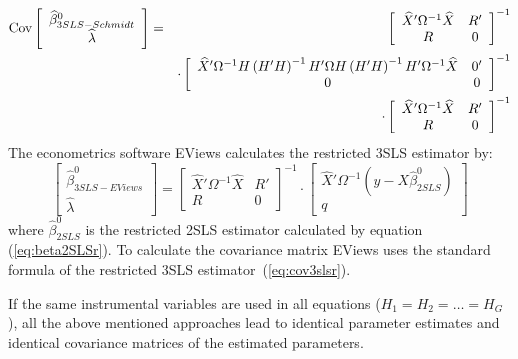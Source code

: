 \begin{eqnarray}
   \text{Cov} 
   \left[ \begin{array}{c}
      \widehat{\beta}^0_{3SLS-Schmidt} \\ \widehat{\lambda}
   \end{array} \right] 
   & = & 
   \left[ \begin{array}{cc}
      \widehat{X}' \Omega^{-1} \widehat{X} & R' \\ 
      R & 0
   \end{array} \right]^{-1}
   \\
   & & \cdot
   \left[ \begin{array}{cc}
      \widehat{X}' \Omega^{-1} H \left( H' H \right)^{-1} H' \Omega
      H \left( H' H \right)^{-1} H' \Omega^{-1} \widehat{X} & 0' \\ 
      0 & 0
   \end{array} \right]^{-1}
   \nonumber \\
   & & \cdot
   \left[ \begin{array}{cc}
      \widehat{X}' \Omega^{-1} \widehat{X} & R' \\ 
      R & 0
   \end{array} \right]^{-1}
   \nonumber
\end{eqnarray}
The econometrics software EViews calculates the restricted 3SLS estimator by:
\begin{equation}
   \left[ \begin{array}{c}
      \widehat{\beta}^0_{3SLS-EViews} \\ \widehat{\lambda}
   \end{array} \right]
   =
   \left[ \begin{array}{cc}
      \widehat{X}' \Omega^{-1} \widehat{X} & R' \\ 
      R & 0
   \end{array} \right]^{-1}
   \cdot
   \left[ \begin{array}{c}
      \widehat{X}' \Omega^{-1} \left( y - X \widehat{\beta}^0_{2SLS} \right)
      \\ q 
   \end{array} \right]
   \label{eq:3slsEViewsR}
\end{equation}
where $\widehat{\beta}^0_{2SLS}$ is the restricted 2SLS estimator calculated
by equation (\ref{eq:beta2SLSr}). 
To calculate the covariance matrix
EViews uses the standard formula of the restricted 3SLS
estimator~(\ref{eq:cov3slsr}).


If the same instrumental variables are used in all equations 
($H_1 = H_2 = \ldots = H_G$), 
all the above mentioned approaches lead to identical parameter estimates
and identical covariance matrices of the estimated parameters.

